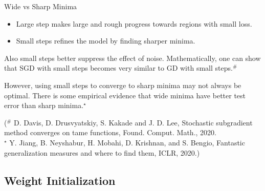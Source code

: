 \begin{frame}[allowframebreaks]

\begin{myconceptblock}{6.29}{Wide vs Sharp Minima}
    \begin{itemize}
        \item Large step makes large and rough progress towards regions with small loss.
        \item Small steps refines the model by finding sharper minima.
    \end{itemize}

    Also small steps better suppress the effect of noise. Mathematically, one can show that SGD with small steps becomes very similar to GD with small steps.${ }^{\#}$

    However, using small steps to converge to sharp minima may not always be optimal. There is some empirical evidence that wide minima have better test error than sharp minima.${ }^{\star}$

    (${ }^{\#}$ D. Davis, D. Drusvyatskiy, S. Kakade and J. D. Lee, Stochastic subgradient method converges on tame functions, Found. Comput. Math., 2020.\\
    ${ }^{\star}$ Y. Jiang, B. Neyshabur, H. Mobahi, D. Krishnan, and S. Bengio, Fantastic generalization measures and where to find them, ICLR, 2020.)
\end{myconceptblock}

\end{frame}

\subsection{Weight Initialization}

